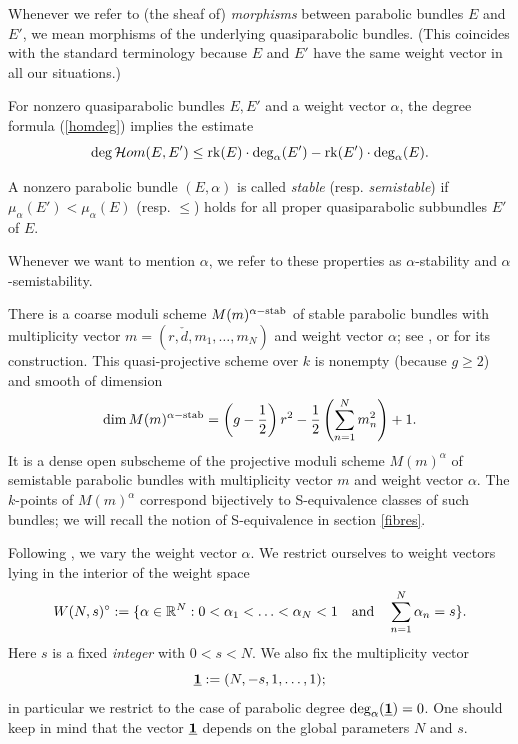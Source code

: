 \documentclass{article}
\begin{document}
Whenever we refer to (the sheaf of) \emph{morphisms} between parabolic bundles $E$ and $E'$, we mean morphisms of the underlying quasiparabolic bundles.
(This coincides with the standard terminology because $E$ and $E'$ have the same weight vector in all our situations.)

For nonzero quasiparabolic bundles $E, E'$ and a weight vector $\alpha$, the degree formula (\ref{homdeg}) implies the estimate
\begin{equation} \label{homestimate}
  \deg \mathcal{H}om(E, E')  \leq \mathrm{rk}(E) \cdot \deg_{\alpha}(E') - \mathrm{rk}(E') \cdot \deg_{\alpha}(E).
\end{equation}

\begin{defn}
  A nonzero parabolic bundle $(E, \alpha)$ is called \emph{stable} (resp. \emph{semistable}) if $\mu_{\alpha}(E') < \mu_{\alpha}(E)$ (resp. $\leq$) holds
  for all proper quasiparabolic subbundles $E'$ of $E$.
\end{defn}
Whenever we want to mention $\alpha$, we refer to these properties as $\alpha$-stability and $\alpha$-semistability.

There is a coarse moduli scheme $M(m)^{\alpha-\mathrm{stab}}$ of stable parabolic bundles with multiplicity vector $m = (r, \check{d}, m_1, \ldots, m_N)$ and
weight vector $\alpha$; see \cite{mehta}, \cite{seshadri} or \cite{bhosle} for its construction. This quasi-projective scheme over $k$ is nonempty
(because $g \geq 2$) and smooth of dimension
\begin{equation} \label{dim}
  \dim M(m)^{\alpha-\mathrm{stab}} = \left( g-\frac{1}{2} \right) r^2 - \frac{1}{2} \left( \sum_{n=1}^N m_n^2 \right) + 1.
\end{equation}
It is a dense open subscheme of the projective moduli scheme $M(m)^{\alpha}$ of semistable parabolic bundles with multiplicity vector $m$ and weight
vector $\alpha$. The $k$-points of $M(m)^{\alpha}$ correspond bijectively to S-equivalence classes of such bundles; we will recall the notion of
S-equivalence in section \ref{fibres}.

Following \cite{boden}, we vary the weight vector $\alpha$. We restrict ourselves to weight vectors lying in the interior of the weight space
\begin{displaymath}
  W(N, s)^{\circ} := \{ \alpha \in \mathbb{R}^N: 0 < \alpha_1 < \ldots < \alpha_N < 1 \quad\mbox{and}\quad \sum_{n=1}^N \alpha_n = s \}.
\end{displaymath}
Here $s$ is a fixed \emph{integer} with $0<s<N$. We also fix the multiplicity vector
\begin{displaymath}
  \underline{\mathbf{1}} := (N, -s, 1, \ldots, 1);
\end{displaymath}
in particular we restrict to the case of parabolic degree $\deg_{\alpha}(\underline{\mathbf{1}}) = 0$. One should keep in mind that the vector $\underline{\mathbf{1}}$ depends on the global
parameters $N$ and $s$.
\end{document}
